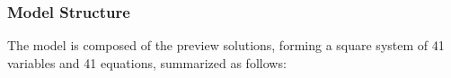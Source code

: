 \documentclass[../thesis.tex]{subfiles}
\begin{document}
\begin{comment}

\begin{align}
	Y_{t} &= Y_{1 t} + Y_{2 t} \label{eq:reg-market-clearing-condition-Yt} \\
	& \text{where:} \quad Y_{\eta t} = C_{\eta 1 t} + C_{\eta 2 t} + I_{\eta t} \label{eq:reg-regional-demand} \\
	L_{\eta t} &= \int_{0}^{1} L_{\eta jt} \dif j \label{eq:reg-market-clearing-condition-Lt}
\end{align}

\end{comment}



\subsubsection{Model Structure}

The model is composed of the preview solutions, forming a square system of 41 variables and 41 equations, summarized as follows:
\end{document}
